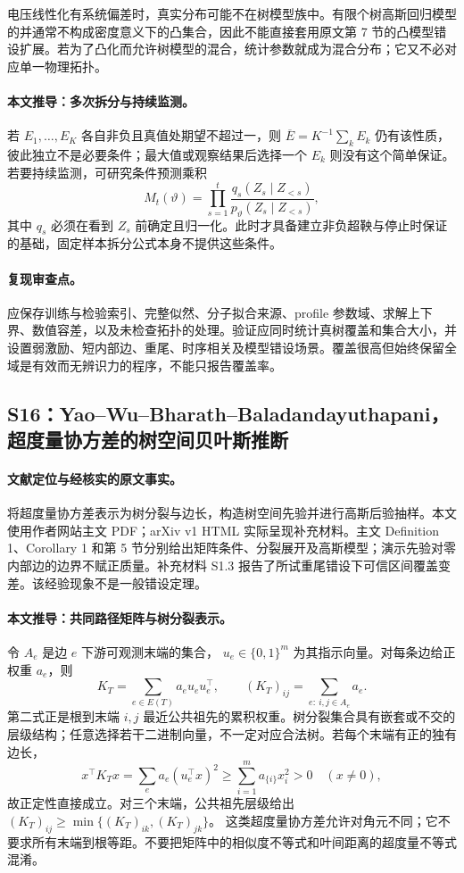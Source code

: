 电压线性化有系统偏差时，真实分布可能不在树模型族中。有限个树高斯回归模型的并通常不构成密度意义下的凸集合，因此不能直接套用原文第 7 节的凸模型错设扩展。若为了凸化而允许树模型的混合，统计参数就成为混合分布；它又不必对应单一物理拓扑。

\paragraph{本文推导：多次拆分与持续监测。}
若 $E_1,\ldots,E_K$ 各自非负且真值处期望不超过一，则
$\overline E=K^{-1}\sum_k E_k$ 仍有该性质，彼此独立不是必要条件；最大值或观察结果后选择一个 $E_k$ 则没有这个简单保证。若要持续监测，可研究条件预测乘积
\[
 M_t(\vartheta)
 =\prod_{s=1}^t
 \frac{q_s(Z_s\mid Z_{<s})}{p_\vartheta(Z_s\mid Z_{<s})},
\]
其中 $q_s$ 必须在看到 $Z_s$ 前确定且归一化。此时才具备建立非负超鞅与停止时保证的基础，固定样本拆分公式本身不提供这些条件。

\paragraph{复现审查点。}
应保存训练与检验索引、完整似然、分子拟合来源、profile 参数域、求解上下界、数值容差，以及未检查拓扑的处理。验证应同时统计真树覆盖和集合大小，并设置弱激励、短内部边、重尾、时序相关及模型错设场景。覆盖很高但始终保留全域是有效而无辨识力的程序，不能只报告覆盖率。

\subsection{S16：Yao--Wu--Bharath--Baladandayuthapani，超度量协方差的树空间贝叶斯推断}
\label{subsec:S16}

\paragraph{文献定位与经核实的原文事实。}
\citet{S16} 将超度量协方差表示为树分裂与边长，构造树空间先验并进行高斯后验抽样。本文使用作者网站主文 PDF；arXiv v1 HTML 实际呈现补充材料。主文 Definition 1、Corollary 1 和第 5 节分别给出矩阵条件、分裂展开及高斯模型；演示先验对零内部边的边界不赋正质量。补充材料 S1.3 报告了所试重尾错设下可信区间覆盖变差。该经验现象不是一般错设定理。

\paragraph{本文推导：共同路径矩阵与树分裂表示。}
令 $A_e$ 是边 $e$ 下游可观测末端的集合，
$u_e\in\{0,1\}^m$ 为其指示向量。对每条边给正权重 $a_e$，则
\[
 K_T=\sum_{e\in E(T)}a_eu_eu_e^\top,\qquad
 (K_T)_{ij}=\sum_{e:\ i,j\in A_e}a_e.
\]
第二式正是根到末端 $i,j$ 最近公共祖先的累积权重。树分裂集合具有嵌套或不交的层级结构；任意选择若干二进制向量，不一定对应合法树。若每个末端有正的独有边长，
\[
 x^\top K_Tx=\sum_e a_e(u_e^\top x)^2
 \ge\sum_{i=1}^m a_{\{i\}}x_i^2>0
 \quad(x\ne0),
\]
故正定性直接成立。对三个末端，公共祖先层级给出
$(K_T)_{ij}\ge\min\{(K_T)_{ik},(K_T)_{jk}\}$。
这类超度量协方差允许对角元不同；它不要求所有末端到根等距。不要把矩阵中的相似度不等式和叶间距离的超度量不等式混淆。

